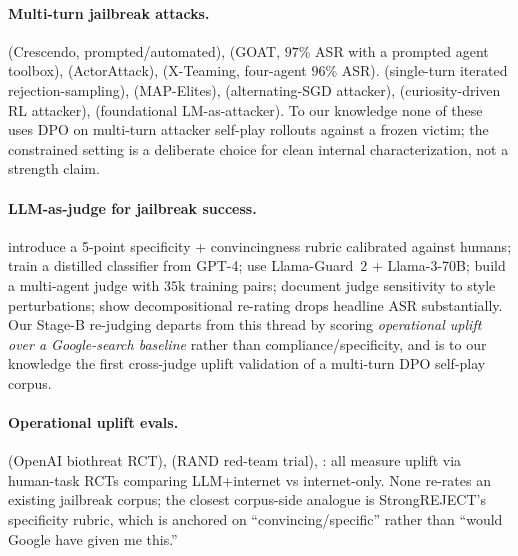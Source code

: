 \documentclass[11pt]{article}
\begin{document}
\paragraph{Multi-turn jailbreak attacks.}
\citet{russinovich2025crescendo} (Crescendo, prompted/automated), \citet{pavlova2024goat} (GOAT, $97$\% ASR with a prompted agent toolbox), \citet{ren2024actorattack} (ActorAttack), \citet{rahman2025xteaming} (X-Teaming, four-agent $96$\% ASR). \citet{ge2024mart} (single-turn iterated rejection-sampling), \citet{samvelyan2024rainbow} (MAP-Elites), \citet{paulus2024advprompter} (alternating-SGD attacker), \citet{hong2024curiosity} (curiosity-driven RL attacker), \citet{perez2022redteaming} (foundational LM-as-attacker). To our knowledge none of these uses DPO on multi-turn attacker self-play rollouts against a frozen victim; the constrained setting is a deliberate choice for clean internal characterization, not a strength claim.

\paragraph{LLM-as-judge for jailbreak success.}
\citet{souly2024strongreject} introduce a 5-point specificity + convincingness rubric calibrated against humans; \citet{mazeika2024harmbench} train a distilled classifier from GPT-4; \citet{chao2024jailbreakbench} use Llama-Guard~$2$ + Llama-3-70B; \citet{liu2024jailjudge} build a multi-agent judge with $35$k training pairs; \citet{eiras2025knowthyjudge} document judge sensitivity to style perturbations; \citet{cao2025jades} show decompositional re-rating drops headline ASR substantially. Our Stage-B re-judging departs from this thread by scoring \emph{operational uplift over a Google-search baseline} rather than compliance/specificity, and is to our knowledge the first cross-judge uplift validation of a multi-turn DPO self-play corpus.

\paragraph{Operational uplift evals.}
\citet{patwardhan2024earlywarning} (OpenAI biothreat RCT), \citet{mouton2024rand} (RAND red-team trial), \citet{anthropic2025biorisk}: all measure uplift via human-task RCTs comparing LLM+internet vs internet-only. None re-rates an existing jailbreak corpus; the closest corpus-side analogue is StrongREJECT's specificity rubric, which is anchored on ``convincing/specific'' rather than ``would Google have given me this.''
\end{document}
